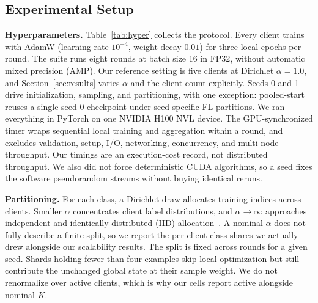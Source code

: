 \documentclass[letterpaper, conference]{IEEEtran}
\begin{document}
\subsection{Experimental Setup}

\textbf{Hyperparameters.}
Table~\ref{tab:hyper} collects the protocol. Every client trains with AdamW
(learning rate $10^{-4}$, weight decay $0.01$) for three local epochs per round.
The suite runs eight rounds at batch size 16 in FP32, without automatic mixed
precision (AMP). Our reference setting is five clients at Dirichlet $\alpha=1.0$,
and Section~\ref{sec:results} varies $\alpha$ and the client count explicitly. Seeds
0 and 1 drive initialization, sampling, and partitioning, with one exception:
pooled-start reuses a single seed-0 checkpoint under seed-specific FL partitions. We
ran everything in PyTorch on one NVIDIA H100 NVL device. The GPU-synchronized timer
wraps sequential local training and
aggregation within a round, and excludes validation, setup, I/O, networking,
concurrency, and multi-node throughput. Our timings are an execution-cost record,
not distributed throughput. We also did not force deterministic CUDA algorithms, so
a seed fixes the software pseudorandom streams without buying identical reruns.

\textbf{Partitioning.}
For each class, a Dirichlet draw allocates training indices across clients. Smaller
$\alpha$ concentrates client label distributions, and $\alpha\!\to\!\infty$
approaches independent and identically distributed (IID)
allocation~. A nominal $\alpha$ does not fully describe a finite split,
so we report the per-client class shares we actually drew alongside our scalability
results. The split is fixed across rounds for a given seed. Shards
holding fewer than four examples skip local optimization but still contribute the
unchanged global state at their sample weight. We do not renormalize over active
clients, which is why our cells report active alongside nominal $K$.
\end{document}
